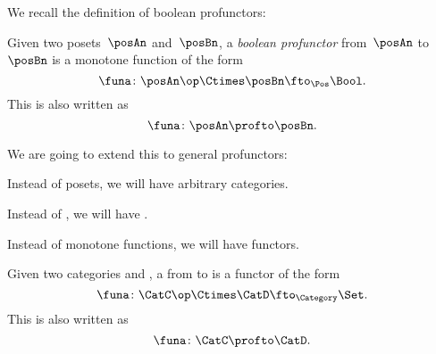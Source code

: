 We recall the definition of boolean profunctors:

\begin{ctdefinition}
    \label{def:boolean-profunctor-again}
    Given two posets~$\posAn$ and~$\posBn$, a \emph{boolean profunctor} from~$\posAn$ to~$\posBn$ is a monotone function of the form
    \begin{equation}
        \label{eq:boolean-profunctor-funa}
        \funa\colon \posAn\op \Ctimes \posBn \fto_{\Pos} \Bool.
    \end{equation}
    This is also written as
    \begin{equation}
        \funa\colon \posAn \profto \posBn.
    \end{equation}
\end{ctdefinition}

We are going to extend this to general profunctors:
\begin{compactitem}
    \item Instead of posets, we will have arbitrary categories.
    \item Instead of \Bool, we will have \Set.
    \item Instead of monotone functions, we will have functors.
\end{compactitem}

\begin{ctdefinition}[Profunctors]
    \label{def:profunctor}
    Given two categories \CatC and \CatD, a \emph{} from \CatC to \CatD is a functor of the form
    \begin{equation}
        \label{eq:profunctors-def-1}
        \funa\colon \CatC\op \Ctimes \CatD \fto_{\Category} \Set.
    \end{equation}
    This is also written as
    \begin{equation}
        \label{eq:profunctors-def-2}
        \funa\colon \CatC \profto \CatD.
    \end{equation}
\end{ctdefinition}


